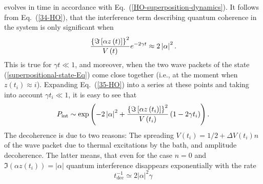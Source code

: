\documentclass[12pt,twoside,a4paper]{report}
\begin{document}
evolves in time in accordance with Eq.~(\ref{HO-superposition-dynamics}). 
It follows from Eq.~(\ref{34-HO}), that the interference term describing
quantum coherence in the system is only significant when
\begin{equation}
\frac{\left\{ {\Im}\left[ \alpha z\left( t\right) \right] \right\} ^2}{%
  V\left( t\right) }e^{-2\gamma t}\approx 2\left| \alpha \right| ^2.
\label{35-HO}
\end{equation}
This is true for $\gamma t\ll 1$, and moreover, when the two wave packets
 of the state (\ref{superpositional-state-Eq}) come close together
(i.e., at the moment when 
$ z\left( t_i\right) \approx {{i}}$). Expanding Eq.~(\ref{35-HO}) into 
a series at these points and taking
into account $\gamma t_i \ll 1$, it is easy to see that 
\begin{equation}
P_{\rm int}
 \sim
  \exp \left( 
          -   2 \left| \alpha \right| ^2
          +   \frac
                  {\left\{ {\Im}
                               \left[
                                  \alpha z\left( t_{{i}}\right) 
                               \right] 
                   \right\} ^2}
                  {V \left( t_i \right) }
              \left( 1-2\gamma t_i \right) 
      \right). 
\label{36-HO}
\end{equation}
The decoherence is due to two reasons:
The spreading 
$V\left( t_i \right) =1/2+\Delta V\left(t_{{i}}\right) n$
of the wave packet 
due to thermal excitations by the bath,
and amplitude decoherence. The latter means, 
that even for the case 
$ n=0 $ and 
$  
      {\Im}
             \left(
                \alpha z\left( t_i\right) 
             \right) 
  =  \left| \alpha \right|$ 
quantum interference disappears exponentially with the rate
\begin{equation}
  t_{\mathrm{dec}}^{-1}\simeq 2\left| \alpha \right| ^2\gamma
  \label{37-HO}
\end{equation}
\end{document}
